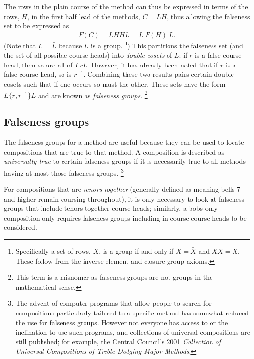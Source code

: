 \documentclass[a4paper,11pt,oneside]{book}
\def\textitidx#1{\textit{#1}\index{#1}}
\begin{document}
The rows in the plain course of the method can thus be expressed in terms of
the rows, $H$, in the first half lead of the methods, $C = LH$, thus allowing
the falseness set to be expressed as 
\[ F(C) = L H \bar{H} \bar{L} = L\; F(H)\; L. \]
(Note that $L=\bar{L}$ because $L$ is a group.%
\footnote{Specifically a set of rows, $X$, is a group if and only if
$X=\bar{X}$ and $XX=X$.  
These follow from the inverse element and closure group axioms.})
This partitions the falseness set (and the 
set of all possible course heads) into \textitidx{double cosets} of $L$:
if $r$ is a false course head, then so are all of $LrL$.  However, it has
already been noted that if $r$ is a false course head, so is $r^{-1}$.  
Combining these two results pairs certain double cosets such that if
one occurs so must the other.  These sets have the form $L\{r,r^{-1}\}L$ 
and are known as \textit{falseness groups}.%
\footnote{This term is a misnomer as falseness groups are not groups 
in the mathematical sense.}


\subsection{Falseness groups}

The falseness groups for a method are useful because they can be used to
locate compositions that are true to that method.  A composition is described
as \textitidx{universally true} to certain falseness groups if it is 
necessarily true to all methods having at most those falseness groups.%
\footnote{The advent of computer programs that allow people to search for 
compositions particularly tailored to a specific method has somewhat 
reduced the use  for falseness groups.  
However not everyone has access to or the inclination
to use such programs, and collections of universal compositions are still
published; for example, the Central Council's 2001 
\textit{Collection of Universal Compositions of Treble Dodging Major Methods}.%
}

For compositions that are \textitidx{tenors-together} (generally defined as
meaning bells 7 and higher remain coursing throughout), it is only necessary
to look at falseness groups that include tenors-together course heads;
similarly, a bobs-only composition only requires falseness groups including
in-course 
course heads to be considered.
\end{document}
